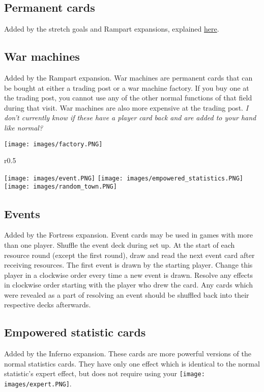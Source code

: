 \documentclass[12pt]{article}
\begin{document}
\subsection*{Permanent cards}
Added by the stretch goals and Rampart expansions, explained \hyperlink{Playerdecks}{here}.
\subsection*{War machines}
Added by the Rampart expansion. War machines are permanent cards that can be bought at either a trading post or a war machine factory. If you buy one at the trading post, you cannot use any of the other normal functions of that field during that visit. War machines are also more expensive at the trading post. \textit{I don't currently know if these have a player card back and are added to your hand like normal?}\par
\texttt{[image: images/factory.PNG]}

\clearpage
\begin{wrapfigure}{r}{0.5\textwidth}
    \begin{center}
    \texttt{[image: images/event.PNG]}
    \texttt{[image: images/empowered\_statistics.PNG]}
    \texttt{[image: images/random\_town.PNG]}
    \end{center}
\end{wrapfigure}
\subsection*{Events}
Added by the Fortress expansion. Event cards may be used in games with more than one player. Shuffle the event deck during set up. At the start of each resource round (except the first round), draw and read the next event card after receiving resources. The first event is drawn by the starting player. Change this player in a clockwise order every time a new event is drawn. Resolve any effects in clockwise order starting with the player who drew the card. Any cards which were revealed as a part of resolving an event should be shuffled back into their respective decks afterwards.
\subsection*{Empowered statistic cards}
Added by the Inferno expansion. These cards are more powerful versions of the normal statistics cards. They have only one effect which is identical to the normal statistic's expert effect, but does not require using your \texttt{[image: images/expert.PNG]}.
\end{document}
